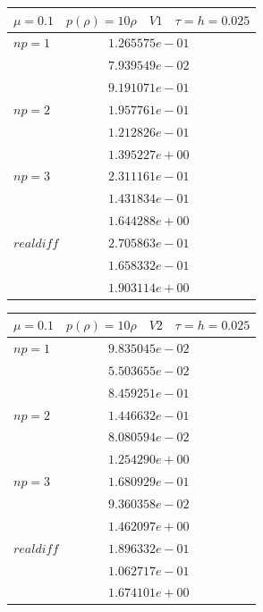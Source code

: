 \documentclass[a4paper,12pt]{extarticle}
\begin{document}
\begin{tabular}{|l|l|}
	\hline
	\multicolumn{2}{|c|}{$\mu =0.1 \quad  p(\rho) =10 \rho \quad V1 \quad\tau = h = 0.025$}\\
	\hline
	$ np = 1$  & $1.265575e-01$\\
	& $7.939549e-02$\\
	& $9.191071e-01$\\
	\hline
	$ np = 2$  & $1.957761e-01$\\
	& $1.212826e-01$\\
	& $1.395227e+00$\\
	\hline
	$ np = 3$  & $2.311161e-01$\\
	& $1.431834e-01$\\
	& $1.644288e+00$\\
	\hline
	$ real diff $  & $2.705863e-01$\\
	& $1.658332e-01$\\
	& $1.903114e+00$\\
	\hline
\end{tabular}

\begin{tabular}{|l|l|}
	\hline
	\multicolumn{2}{|c|}{$\mu =0.1 \quad  p(\rho) =10 \rho \quad V2 \quad\tau = h = 0.025$}\\
	\hline
	$ np = 1$  & $9.835045e-02$\\
	& $5.503655e-02$\\
	& $8.459251e-01$\\
	\hline
	$ np = 2$  & $1.446632e-01$\\
	& $8.080594e-02$\\
	& $1.254290e+00$\\
	\hline
	$ np = 3$  & $1.680929e-01$\\
	& $9.360358e-02$\\
	& $1.462097e+00$\\
	\hline
	$ real diff $  & $1.896332e-01$\\
	& $1.062717e-01$\\
	& $1.674101e+00$\\
	\hline
\end{tabular}


	
\end{document}
